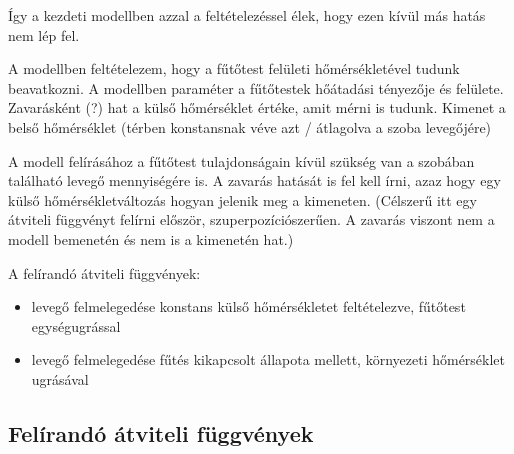 Így a kezdeti modellben azzal a feltételezéssel élek, hogy ezen kívül más hatás nem lép fel.

A modellben feltételezem, hogy a fűtőtest felületi hőmérsékletével tudunk beavatkozni. A modellben paraméter a fűtőtestek hőátadási tényezője és felülete. Zavarásként (?) hat a külső hőmérséklet értéke, amit mérni is tudunk. Kimenet a belső hőmérséklet (térben konstansnak véve azt / átlagolva a szoba levegőjére)

A modell felírásához a fűtőtest tulajdonságain kívül szükség van a szobában található levegő mennyiségére is. A zavarás hatását is fel kell írni, azaz hogy egy külső hőmérsékletváltozás hogyan jelenik meg a kimeneten. (Célszerű itt egy átviteli függvényt felírni először, szuperpozíciószerűen. A zavarás viszont nem a modell bemenetén és nem is a kimenetén hat.)

A felírandó átviteli függvények:

\begin{itemize}[noitemsep,topsep=0pt,parsep=0pt,partopsep=0pt]
	\item levegő felmelegedése konstans külső hőmérsékletet feltételezve, fűtőtest egységugrással
	\item levegő felmelegedése fűtés kikapcsolt állapota mellett, környezeti hőmérséklet ugrásával
\end{itemize}

\pagebreak



\subsection{Felírandó átviteli függvények}












\pagebreak